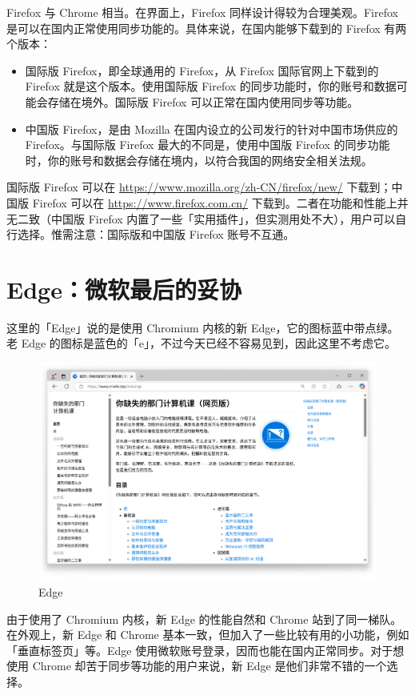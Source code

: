 Firefox 与 Chrome 相当。在界面上，Firefox 同样设计得较为合理美观。Firefox 是可以在国内正常使用同步功能的。具体来说，在国内能够下载到的 Firefox 有两个版本：

\begin{itemize}
  \item 国际版 Firefox，即全球通用的 Firefox，从 Firefox 国际官网上下载到的 Firefox 就是这个版本。使用国际版 Firefox 的同步功能时，你的账号和数据可能会存储在境外。国际版 Firefox 可以正常在国内使用同步等功能。
  \item 中国版 Firefox，是由 Mozilla 在国内设立的公司发行的针对中国市场供应的 Firefox。与国际版 Firefox 最大的不同是，使用中国版 Firefox 的同步功能时，你的账号和数据会存储在境内，以符合我国的网络安全相关法规。
\end{itemize}

国际版 Firefox 可以在 \url{https://www.mozilla.org/zh-CN/firefox/new/} 下载到；中国版 Firefox 可以在 \url{https://www.firefox.com.cn/} 下载到。二者在功能和性能上并无二致（中国版 Firefox 内置了一些「实用插件」，但实测用处不大），用户可以自行选择。惟需注意：国际版和中国版 Firefox 账号不互通。

\section{Edge：微软最后的妥协}

这里的「Edge」说的是使用 Chromium 内核的新 Edge，它的图标蓝中带点绿。老 Edge 的图标是蓝色的「e」，不过今天已经不容易见到，因此这里不考虑它。

\begin{figure}[htb!]
  \centering
  \includegraphics[width=.75\textwidth]{assets/software/Missing_homepage_in_Edge.png}
  \caption{Edge}
  \label{fig:Missing_homepage_in_Edge}
\end{figure}

由于使用了 Chromium 内核，新 Edge 的性能自然和 Chrome 站到了同一梯队。在外观上，新 Edge 和 Chrome 基本一致，但加入了一些比较有用的小功能，例如「垂直标签页」等。Edge 使用微软账号登录，因而也能在国内正常同步。对于想使用 Chrome 却苦于同步等功能的用户来说，新 Edge 是他们非常不错的一个选择。

